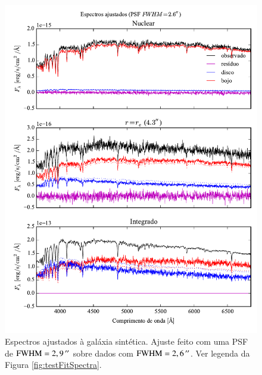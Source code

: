 \begin{figure}
	\includegraphics{figuras/simulation_spectra_psf26}
	\caption[Espectros ajustados (teste com PSF $\mathrm{FWHM} = 2,6\,\arcs$).]
	{Espectros ajustados à galáxia sintética. Ajuste feito com uma PSF de
	$\mathrm{FWHM} = 2,9\,^{\prime\prime}$ sobre dados com $\mathrm{FWHM} = 2,6\,\arcs$. Ver
	legenda da Figura \ref{fig:testFitSpectra}.}
	\label{fig:testFitSpectra26}
\end{figure}

